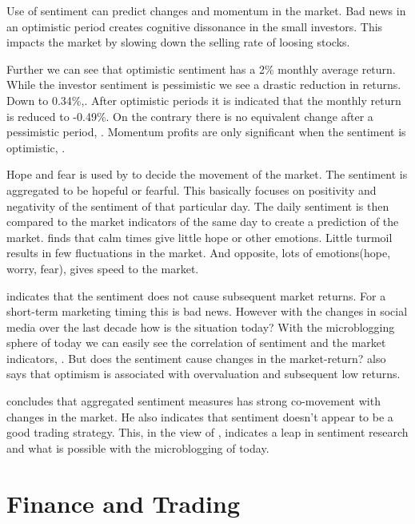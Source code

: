 Use of sentiment can predict changes and momentum in the market.
Bad news in an optimistic period creates cognitive dissonance in the small
investors. This impacts the market by slowing down the selling rate of loosing
stocks. \cite[p29]{doukas10:sentiment_and_momentum}

Further we can see that optimistic sentiment has a 2\% monthly average return.
While the investor sentiment is pessimistic we see a drastic reduction in
returns. Down to 0.34\%,\cite[p5]{doukas10:sentiment_and_momentum}.
After optimistic periods it is indicated that the monthly return is reduced to
-0.49\%. On the contrary there is no equivalent change after a pessimistic
period, \cite[p6-7]{doukas10:sentiment_and_momentum}.
Momentum profits are only significant when the sentiment is optimistic,
\cite[p29]{doukas10:sentiment_and_momentum}.

Hope and fear is used by \cite[]{Zhang201155} to decide the movement of the
market. The sentiment is aggregated to be hopeful or fearful. This basically
focuses on positivity and negativity of the sentiment of that particular day.
The daily sentiment is then compared to the market indicators of the same day
to create a prediction of the market. \cite[]{Zhang201155} finds that calm
times give little hope or other emotions. Little turmoil results in few
fluctuations in the market. And opposite, lots of emotions(hope, worry, fear),
gives speed to the market.

\cite[p3]{Brown20041} indicates that the sentiment does not cause subsequent
market returns. For a short-term marketing timing this is bad news. However
with the changes in social media over the last decade how is the situation
today? With the microblogging sphere of today we can easily see the
correlation of sentiment and the market indicators,
\cite[]{annikajubbega11:twitter_driver_stock_price}. But
does the sentiment cause changes in the market-return?
\cite[p3]{Brown20041} also says that optimism is associated with overvaluation
and subsequent low returns.

\cite[p]{Brown20041} concludes that aggregated sentiment measures has strong
co-movement with changes in the market. He also indicates that sentiment
doesn't appear to be a good trading strategy. This, in the view of
\cite[]{Zhang201155}, indicates a leap in sentiment research and what is possible
with the microblogging of today.

\section{Finance and Trading}

